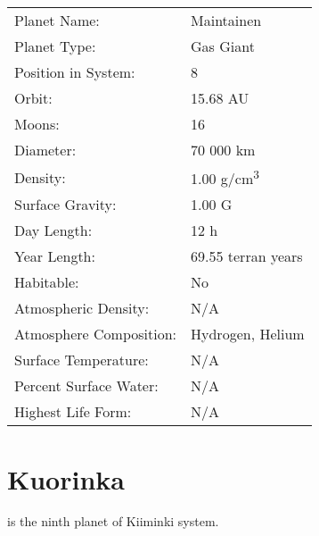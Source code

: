 \documentclass{tufte-book}
\begin{document}
\bigskip
\begin{minipage}{\textwidth}
\begin{center}
\begin{tabular}{ll}
\toprule
Planet Name: & Maintainen \\
Planet Type: & Gas Giant \\
Position in System: & 8 \\
Orbit: & 15.68 AU \\
Moons: & 16 \\
Diameter: & 70 000 km \\
Density: & 1.00 g/cm\textsuperscript{3} \\
Surface Gravity: & 1.00 G \\
Day Length: & 12 h \\
Year Length: & 69.55 terran years \\
Habitable: & No \\
\quad Atmospheric Density: & N/A \\
\quad Atmosphere Composition: & Hydrogen, Helium \\
\quad Surface Temperature: & N/A \\
\quad Percent Surface Water: & N/A \\
\quad Highest Life Form: & N/A \\

\bottomrule
\end{tabular}
\end{center}
\end{minipage}


\section{Kuorinka}

 is the ninth planet of Kiiminki system.
\end{document}
